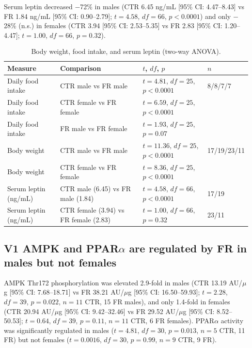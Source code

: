 \documentclass[11pt]{article}
\begin{document}
Serum leptin decreased $-$72\% in males (CTR 6.45 ng/mL [95\% CI: 4.47--8.43] vs FR 1.84 ng/mL [95\% CI: 0.90--2.79]; $t = 4.58$, $df = 66$, $p < 0.0001$) and only $-$28\% (n.s.) in females (CTR 3.94 [95\% CI: 2.53--5.35] vs FR 2.83 [95\% CI: 1.20--4.47]; $t = 1.00$, $df = 66$, $p = 0.32$).

\begin{table}[h]
\centering
\caption{Body weight, food intake, and serum leptin (two-way ANOVA).}
\begin{tabular}{llll}
\toprule
Measure & Comparison & $t$, $df$, $p$ & $n$ \\
\midrule
Daily food intake & CTR male vs FR male & $t = 4.81$, $df = 25$, $p < 0.0001$ & 8/8/7/7 \\
Daily food intake & CTR female vs FR female & $t = 6.59$, $df = 25$, $p < 0.0001$ & \\
Daily food intake & FR male vs FR female & $t = 1.93$, $df = 25$, $p = 0.07$ & \\
Body weight & CTR male vs FR male & $t = 11.36$, $df = 25$, $p < 0.0001$ & 17/19/23/11 \\
Body weight & CTR female vs FR female & $t = 8.36$, $df = 25$, $p < 0.0001$ & \\
Serum leptin (ng/mL) & CTR male (6.45) vs FR male (1.84) & $t = 4.58$, $df = 66$, $p < 0.0001$ & 17/19 \\
Serum leptin (ng/mL) & CTR female (3.94) vs FR female (2.83) & $t = 1.00$, $df = 66$, $p = 0.32$ & 23/11 \\
\bottomrule
\end{tabular}
\end{table}

\subsection{V1 AMPK and PPAR$\alpha$ are regulated by FR in males but not females}
AMPK Thr172 phosphorylation was elevated 2.9-fold in males (CTR 13.19 AU/$\mu$g [95\% CI: 7.68--18.71] vs FR 38.21 AU/$\mu$g [95\% CI: 16.50--59.93]; $t = 2.28$, $df = 39$, $p = 0.022$, $n = 11$ CTR, 15 FR males), and only 1.4-fold in females (CTR 20.94 AU/$\mu$g [95\% CI: 9.42--32.46] vs FR 29.52 AU/$\mu$g [95\% CI: 8.52--50.53]; $t = 0.64$, $df = 39$, $p = 0.11$, $n = 11$ CTR, 6 FR females). PPAR$\alpha$ activity was significantly regulated in males ($t = 4.81$, $df = 30$, $p = 0.013$, $n = 5$ CTR, 11 FR) but not females ($t = 0.0016$, $df = 30$, $p = 0.99$, $n = 9$ CTR, 9 FR).
\end{document}
